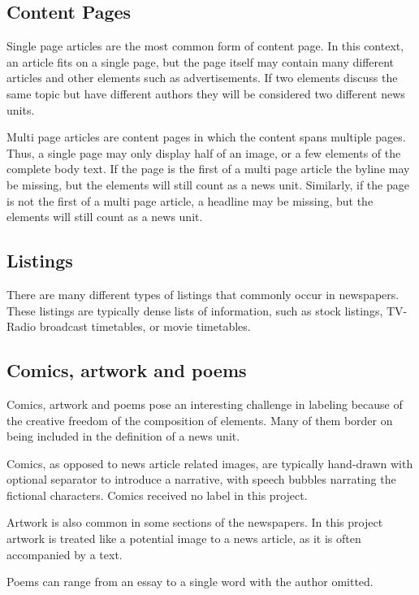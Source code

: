 \documentclass[english, bibtex]{kththesis}
\begin{document}
\subsection{Content Pages}

Single page articles are the most common form of content page. In this context, an article fits on a single page, but the page itself may contain many different articles and other elements such as advertisements. If two elements discuss the same topic but have different authors they will be considered two different news units.

Multi page articles are content pages in which the content spans multiple pages. Thus, a single page may only display half of an image, or a few elements of the complete body text. If the page is the first of a multi page article the byline may be missing, but the elements will still count as a news unit. Similarly, if the page is not the first of a multi page article, a headline may be missing, but the elements will still count as a news unit.

\subsection{Listings}

There are many different types of listings that commonly occur in newspapers. These listings are typically dense lists of information, such as stock listings, TV-Radio broadcast timetables, or movie timetables.

\subsection{Comics, artwork and poems}

Comics, artwork and poems pose an interesting challenge in labeling because of the creative freedom of the composition of elements. Many of them border on being included in the definition of a news unit.

Comics, as opposed to news article related images, are typically hand-drawn with optional separator to introduce a narrative, with speech bubbles narrating the fictional characters. Comics received no label in this project.

Artwork is also common in some sections of the newspapers. In this project artwork is treated like a potential image to a news article, as it is often accompanied by a text.

Poems can range from an essay to a single word with the author omitted.
\end{document}
